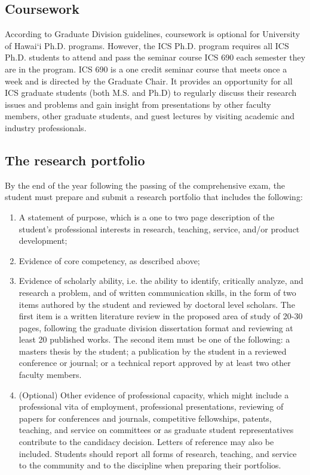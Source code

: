 \documentclass[12pt]{article}
\begin{document}
\subsection{Coursework}

According to Graduate Division guidelines, coursework is optional for
University of Hawai`i Ph.D. programs.  However, the ICS Ph.D. program
requires all ICS Ph.D. students to attend and pass the seminar course ICS
690 each semester they are in the program.  ICS 690 is a one credit seminar
course that meets once a week and is directed by the Graduate Chair. It
provides an opportunity for all ICS graduate students (both M.S. and Ph.D)
to regularly discuss their research issues and problems and gain insight
from presentations by other faculty members, other graduate students, and
guest lectures by visiting academic and industry professionals.  

\subsection{The research portfolio}

By the end of the year following the passing of the comprehensive exam, the student
must prepare and submit a research portfolio that includes the following:

\begin{enumerate}
\item A statement of purpose, which is a one to two page description of the
  student's professional interests in research, teaching, service, and/or
  product development;
\item Evidence of core competency, as described above;
\item Evidence of scholarly ability, i.e. the ability to identify,
  critically analyze, and research a problem, and of written communication
  skills, in the form of two items authored by the student and reviewed by
  doctoral level scholars. The first item is a written literature review in
  the proposed area of study of 20-30 pages, following the graduate
  division dissertation format and reviewing at least 20 published
  works. The second item must be one of the following:  a masters thesis by
  the student; a publication by the student in a reviewed conference or
  journal; or a technical report approved by at least two other faculty
  members. 
\item (Optional) Other evidence of professional capacity, which might
  include a professional vita of employment, professional presentations, reviewing of papers for conferences and journals, competitive fellowships, patents, teaching, and service on committees or as graduate student representatives contribute to the candidacy decision. Letters of reference may also be included. Students should report all forms of research, teaching, and service to the community and to the discipline when preparing their portfolios.
\end{enumerate}
\end{document}
